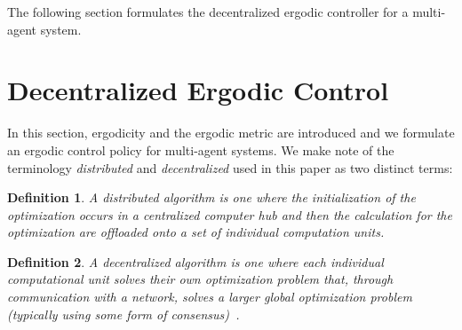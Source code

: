 \documentclass[letterpaper, 10 pt, conference]{ieeeconf}  %
\newtheorem{definition}{Definition}
\begin{document}
The following section formulates the decentralized ergodic controller for a multi-agent system.

\section{Decentralized Ergodic Control}
\label{sec:decentralized-ergodic-control}

In this section, ergodicity and the ergodic metric are introduced and we formulate an ergodic control policy for multi-agent systems.
We make note of the terminology {\it distributed} and {\it decentralized} used in this paper as two distinct terms: 

\begin{definition}
 A {\it distributed} algorithm is one where the initialization of the optimization occurs in a centralized computer hub and then the calculation for the optimization are offloaded onto a set of individual computation units.
\end{definition}
\begin{definition}
 A {\it decentralized} algorithm is one where each individual computational unit solves their own optimization problem that, through communication with a network, solves a larger global optimization problem (typically using some form of consensus)~\cite{deo2016graph, bertsekas1989parallel}.
\end{definition}
\end{document}
